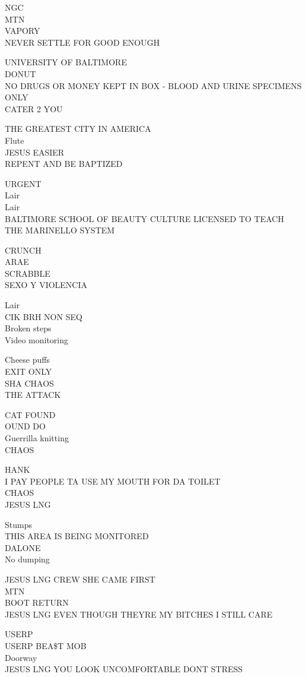 \documentclass[10pt,letterpaper]{article}
\begin{document}
NGC\\
MTN\\
VAPORY\\
NEVER SETTLE FOR GOOD ENOUGH

UNIVERSITY OF BALTIMORE\\
DONUT\\
NO DRUGS OR MONEY KEPT IN BOX {-} BLOOD AND URINE SPECIMENS ONLY\\
CATER 2 YOU

THE GREATEST CITY IN AMERICA\\
Flute\\
JESUS EASIER\\
REPENT AND BE BAPTIZED

URGENT\\
Lair\\
Lair\\
BALTIMORE SCHOOL OF BEAUTY CULTURE LICENSED TO TEACH THE MARINELLO SYSTEM

CRUNCH\\
ARAE\\
SCRABBLE\\
SEXO Y VIOLENCIA

Lair\\
CIK BRH NON SEQ\\
Broken steps\\
Video monitoring

Cheese puffs\\
EXIT ONLY\\
SHA CHAOS\\
THE ATTACK

CAT FOUND\\
OUND DO\\
Guerrilla knitting\\
CHAOS

HANK\\
I PAY PEOPLE TA USE MY MOUTH FOR DA TOILET\\
CHAOS\\
JESUS LNG

Stumps\\
THIS AREA IS BEING MONITORED\\
DALONE\\
No dumping

JESUS LNG CREW SHE CAME FIRST\\
MTN\\
BOOT RETURN\\
JESUS LNG EVEN THOUGH THEYRE MY BITCHES I STILL CARE

USERP\\
USERP BEA\$T MOB\\
Doorway\\
JESUS LNG YOU LOOK UNCOMFORTABLE DONT STRESS
\end{document}
